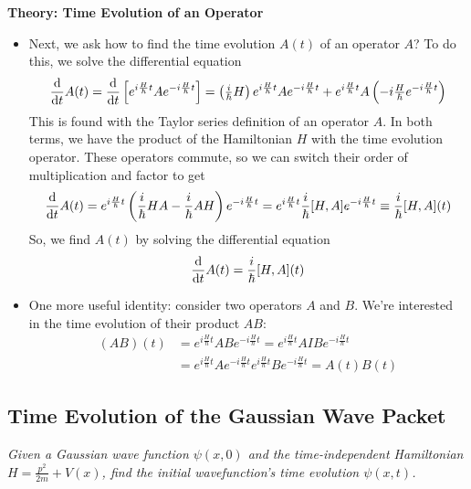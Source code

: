 \documentclass[11pt, a4paper]{article}
\newcommand{\tev}{e^{-i\frac{H}{\hbar}t}}  %
\newcommand{\tevp}{e^{i\frac{H}{\hbar}t}}  %
\begin{document}
\textbf{Theory: Time Evolution of an Operator}
\begin{itemize}
	\item Next, we ask how to find the time evolution $ A(t) $ of an operator $ A $? To do this, we solve the differential equation
	\begin{equation*}
		\dv{t}A(t) = \dv{t}\left[\tevp A \tev \right] = \left(\tfrac{i}{\hbar}H\right)\tevp A \tev + \tevp A\left(-i\tfrac{H}{\hbar}\tev\right)
	\end{equation*}
	This is found with the Taylor series definition of an operator $ A $. In both terms, we have the product of the Hamiltonian $ H $ with the time evolution operator. These operators commute, so we can switch their order of multiplication and factor to get
	\begin{equation*}
		\dv{t}A(t) = \tevp \left(\frac{i}{\hbar}HA - \frac{i}{\hbar}AH\right) \tev = \tevp \frac{i}{\hbar}[H, A]\tev \equiv \frac{i}{\hbar}[H, A](t)
	\end{equation*}
	So, we find $ A(t) $ by solving the differential equation
	\begin{equation*}
		\dv{t}A(t) = \frac{i}{\hbar}[H, A](t)
	\end{equation*}
	
	\item One more useful identity: consider two operators $ A $ and $ B $. We're interested in the time evolution of their product $ AB $: 
	\begin{align*}
		(AB)(t) &= \tevp AB \tev = \tevp A I B \tev\\
		&=\tevp A \tev \tevp B \tev = A(t)B(t)
	\end{align*}

\end{itemize}


\subsection{Time Evolution of the Gaussian Wave Packet}
\textit{Given a Gaussian wave function $ \psi(x, 0) $ and the time-independent Hamiltonian $ H = \frac{p^{2}}{2m} + V(x) $, find the initial wavefunction's time evolution $ \psi(x, t) $.}
\end{document}
